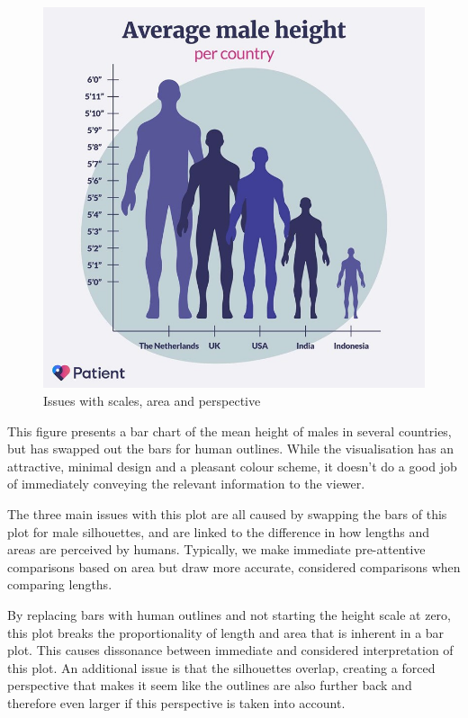 \documentclass[
  12pt,
]{book}
\begin{document}
\begin{figure}
\centering
\includegraphics{images/303-data-visualisation/average-male-height.jpg}
\caption{Issues with scales, area and perspective}
\end{figure}

This figure presents a bar chart of the mean height of males in several countries, but has swapped out the bars for human outlines. While the visualisation has an attractive, minimal design and a pleasant colour scheme, it doesn't do a good job of immediately conveying the relevant information to the viewer.

The three main issues with this plot are all caused by swapping the bars of this plot for male silhouettes, and are linked to the difference in how lengths and areas are perceived by humans. Typically, we make immediate pre-attentive comparisons based on area but draw more accurate, considered comparisons when comparing lengths.

By replacing bars with human outlines and not starting the height scale at zero, this plot breaks the proportionality of length and area that is inherent in a bar plot. This causes dissonance between immediate and considered interpretation of this plot. An additional issue is that the silhouettes overlap, creating a forced perspective that makes it seem like the outlines are also further back and therefore even larger if this perspective is taken into account.
\end{document}
